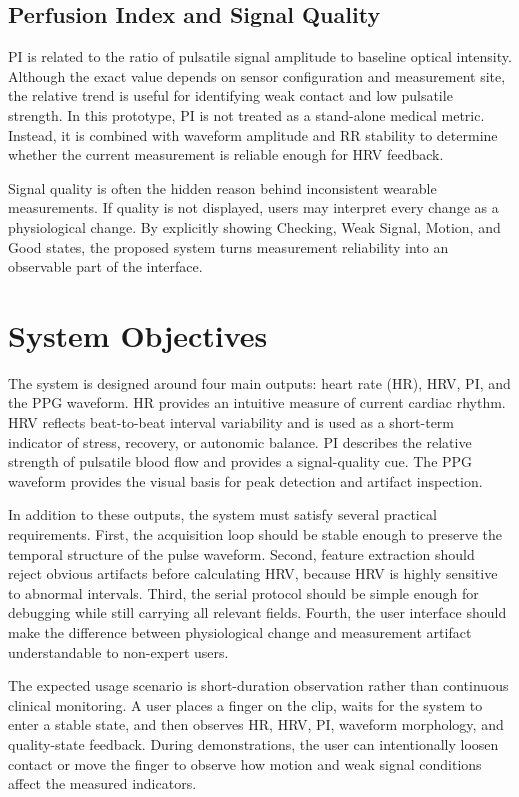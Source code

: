 \documentclass[10pt,conference]{IEEEtran}
\begin{document}
\subsection{Perfusion Index and Signal Quality}
PI is related to the ratio of pulsatile signal amplitude to baseline optical intensity. Although the exact value depends on sensor configuration and measurement site, the relative trend is useful for identifying weak contact and low pulsatile strength. In this prototype, PI is not treated as a stand-alone medical metric. Instead, it is combined with waveform amplitude and RR stability to determine whether the current measurement is reliable enough for HRV feedback.

Signal quality is often the hidden reason behind inconsistent wearable measurements. If quality is not displayed, users may interpret every change as a physiological change. By explicitly showing Checking, Weak Signal, Motion, and Good states, the proposed system turns measurement reliability into an observable part of the interface.

\section{System Objectives}
The system is designed around four main outputs: heart rate (HR), HRV, PI, and the PPG waveform. HR provides an intuitive measure of current cardiac rhythm. HRV reflects beat-to-beat interval variability and is used as a short-term indicator of stress, recovery, or autonomic balance. PI describes the relative strength of pulsatile blood flow and provides a signal-quality cue. The PPG waveform provides the visual basis for peak detection and artifact inspection.


In addition to these outputs, the system must satisfy several practical requirements. First, the acquisition loop should be stable enough to preserve the temporal structure of the pulse waveform. Second, feature extraction should reject obvious artifacts before calculating HRV, because HRV is highly sensitive to abnormal intervals. Third, the serial protocol should be simple enough for debugging while still carrying all relevant fields. Fourth, the user interface should make the difference between physiological change and measurement artifact understandable to non-expert users.

The expected usage scenario is short-duration observation rather than continuous clinical monitoring. A user places a finger on the clip, waits for the system to enter a stable state, and then observes HR, HRV, PI, waveform morphology, and quality-state feedback. During demonstrations, the user can intentionally loosen contact or move the finger to observe how motion and weak signal conditions affect the measured indicators.
\end{document}
